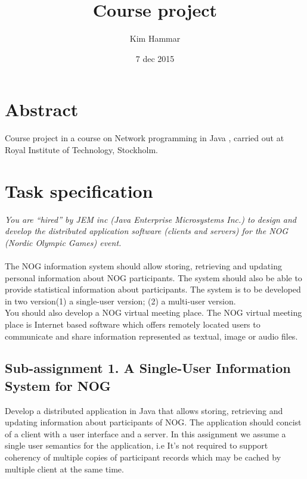 \documentclass[a4paper, 11pt]{article}
\title{Course project}
\author{Kim Hammar}
\date{7 dec 2015}
\begin{document}
\maketitle
\thispagestyle{firststyle}
\begin{versionhistory}
\end{versionhistory}
\newpage
\tableofcontents
\newpage

\section{Abstract}
Course project in a course on Network programming in Java \citep{kth_1}, carried out at Royal Institute of Technology, Stockholm.
\newpage
\section{Task specification}
\textit{You are ``hired'' by JEM inc (Java Enterprise Microsystems Inc.) to design and develop the distributed application software (clients and servers) for the NOG (Nordic Olympic Games) event.} \\ \\
The NOG information system should allow storing, retrieving and updating personal information about NOG participants. The system should also be able to provide statistical information about participants. The system is to be developed in two version(1) a single-user version; (2) a multi-user version. \\ 
You should also develop a NOG virtual meeting place. The NOG virtual meeting place is Internet based software which offers remotely located users to communicate and share information represented as textual, image or audio files. 
\subsection{Sub-assignment 1. A Single-User Information System for NOG}
Develop a distributed application in Java that allows storing, retrieving and updating information about participants of NOG. The application should concist of a client with a user interface and a server. In this assignment we assume a single user semantics for the application, i.e It's not required to support coherency of multiple copies of participant records which may be cached by multiple client at the same time.
\end{document}
